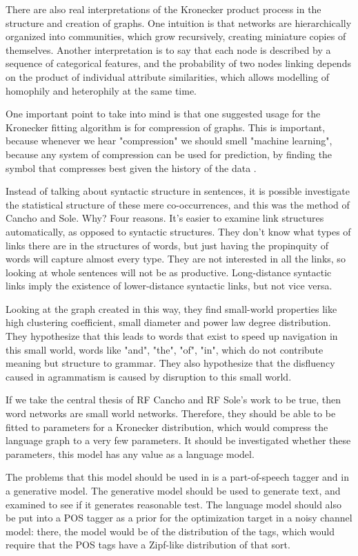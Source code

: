 \documentclass[12pt]{article}
\begin{document}
There are also real interpretations of the Kronecker product process in the structure and creation of graphs. One intuition is that networks are hierarchically organized into communities, which grow recursively, creating miniature copies of themselves. Another interpretation is to say that each node is described by a sequence of categorical features, and the probability of two nodes linking depends on the product of individual attribute similarities, which allows modelling of homophily and heterophily at the same time.

One important point to take into mind is that one suggested usage for the Kronecker fitting algorithm is for compression of graphs. This is important, because whenever we hear "compression" we should smell "machine learning", because any system of compression can be used for prediction, by finding the symbol that compresses best given the history of the data \cite{mlcompression}.

Instead of talking about syntactic structure in sentences, it is possible investigate the statistical structure of these mere co-occurrences, and this was the method of Cancho and Sole. Why? Four reasons. It's easier to examine link structures automatically, as opposed to syntactic structures. They don't know what types of links there are in the structures of words, but just having the propinquity of words will capture almost every type. They are not interested in all the links, so looking at whole sentences will not be as productive. Long-distance syntactic links imply the existence of lower-distance syntactic links, but not vice versa.

Looking at the graph created in this way, they find small-world properties like high clustering coefficient, small diameter and power law degree distribution. They hypothesize that this leads to words that exist to speed up navigation in this small world, words like "and", "the", "of", "in", which do not contribute meaning but structure to grammar. They also hypothesize that the disfluency caused in agrammatism is caused by disruption to this small world.

If we take the central thesis of RF Cancho and RF Sole's work to be true, then word networks are small world networks. Therefore, they should be able to be fitted to parameters for a Kronecker distribution, which would compress the language graph to a very few parameters. It should be investigated whether these parameters, this model has any value as a language model.

The problems that this model should be used in is a part-of-speech tagger and in a generative model. The generative model should be used to generate text, and examined to see if it generates reasonable test. The language model should also be put into a POS tagger as a prior for the optimization target in a noisy channel model: there, the model would be of the distribution of the tags, which would require that the POS tags have a Zipf-like distribution of that sort. \cite{collins}
\end{document}
